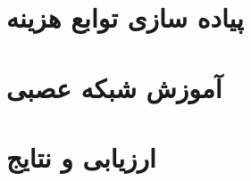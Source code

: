 \documentclass[11pt]{article}
\begin{document}
	\section{پیاده سازی توابع هزینه}
	\section{آموزش شبکه عصبی}
	\section{ارزیابی و نتایج}
	
	
	
	
	
	
	
	
	
	
	
	
	
	
	
	
	
	
	
	
	
	
	
\end{document}
